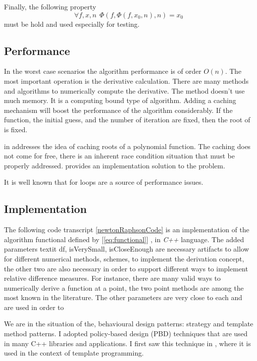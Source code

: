 \documentclass[12pt]{article}
\begin{document}
  Finally, the following property 
  \[
  	\forall f, x, n ~~\Phi(f, \Phi(f, x_0, n), n) = x_0
  \]
  must be hold and used especially for testing.
  
  	\subsection {Performance}
  		In the worst case scenarios the algorithm performance is of order \(O(n)\).  The most important operation is the derivative calculation.  
  		There are many methods and algorithms to numerically compute the derivative.   
  		The method doesn't use much memory.  It is a computing bound type of algorithm.    
  		 Adding a caching mechanism will boost the performance of the algorithm considerably.  
  		 If the function, the initial guess, and the number of iteration are fixed, then the root of is fixed.  
  		 
  		 \citeauthor{meyers2014effective}  in \cite{meyers2014effective}  addresses the idea of caching roots of a polynomial function.  
		 The caching does not come for free, there is an inherent race condition situation that must be properly addressed. 
		 \citeauthor{meyers2014effective} provides an implementation solution to the problem.
		 
		 It is well known that for loops are a source of performance issues.  
  
	\subsection {Implementation}
		
  		The following code transcript \ref{newtonRaphsonCode} is an implementation of the algorithm  functional defined by [\ref{eq:functional}] , in \textit {C++} language.  
  		The added parameters textit {df, isVerySmall, isCloseEnough} are necessary artifacts to allow for different
  		numerical methods, schemes, to implement the derivation concept, the other two are also necessary in order to support different ways to implement relative difference measures.
  		For instance, there are many valid ways to numerically derive a function at a point, the two point methods are among the most known in the literature.
  		The other parameters are very close to each and are used in order to
  
  		We are in the situation of the, behavioural design patterns: strategy and template method patterns.  
  I adopted policy-based design (PBD) techniques that are used in many C++ libraries and applications.  
  I first saw this technique in \citet*{alexandrescu}, where it is used in the context of template programming.
  
\end{document}
